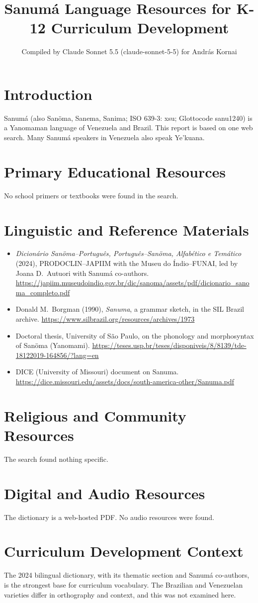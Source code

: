 \documentclass[12pt]{article}
\title{Sanum\'a Language Resources for K-12 Curriculum Development}
\author{Compiled by Claude Sonnet 5.5 (claude-sonnet-5-5) for Andr\'as Kornai}
\date{}
\begin{document}
\maketitle

\section{Introduction}
Sanum\'a (also San\"oma, Sanema, Sanima; ISO 639-3: xsu; Glottocode sanu1240) is a Yanomaman language of Venezuela and Brazil. This report is based on one web search. Many Sanum\'a speakers in Venezuela also speak Ye'kuana.

\section{Primary Educational Resources}
No school primers or textbooks were found in the search.

\section{Linguistic and Reference Materials}
\begin{itemize}
\item \emph{Dicion\'ario San\"oma--Portugu\^es, Portugu\^es--San\"oma, Alfab\'etico e Tem\'atico} (2024), PRODOCLIN--JAPIIM with the Museu do \'Indio--FUNAI, led by Joana D.\ Autuori with Sanum\'a co-authors. \url{https://japiim.museudoindio.gov.br/dic/sanoma/assets/pdf/dicionario_sanoma_completo.pdf}
\item Donald M.\ Borgman (1990), \emph{Sanuma}, a grammar sketch, in the SIL Brazil archive. \url{https://www.silbrazil.org/resources/archives/1973}
\item Doctoral thesis, University of S\~ao Paulo, on the phonology and morphosyntax of San\"oma (Yanomami). \url{https://teses.usp.br/teses/disponiveis/8/8139/tde-18122019-164856/?lang=en}
\item DICE (University of Missouri) document on Sanuma. \url{https://dice.missouri.edu/assets/docs/south-america-other/Sanuma.pdf}
\end{itemize}

\section{Religious and Community Resources}
The search found nothing specific.

\section{Digital and Audio Resources}
The dictionary is a web-hosted PDF. No audio resources were found.

\section{Curriculum Development Context}
The 2024 bilingual dictionary, with its thematic section and Sanum\'a co-authors, is the strongest base for curriculum vocabulary. The Brazilian and Venezuelan varieties differ in orthography and context, and this was not examined here.
\end{document}

